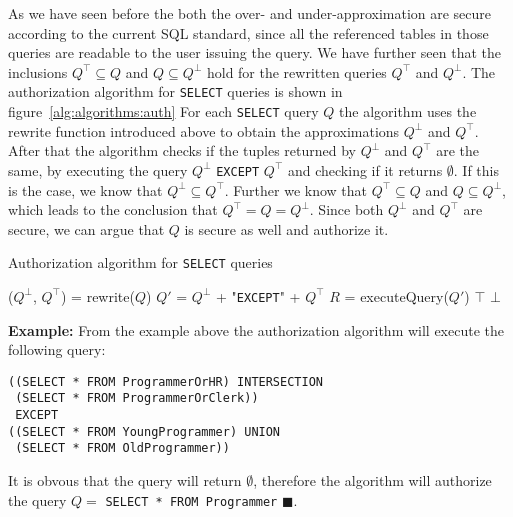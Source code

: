 As we have seen before the both the over- and under-approximation are secure according to the current SQL standard, since all the referenced tables in those queries are readable to the user issuing the query.
%
We have further seen that the inclusions $Q^\top \subseteq Q$ and $Q \subseteq Q^\bot$ hold for the rewritten queries $Q^\top$ and $Q^\bot$.
%
The authorization algorithm for \texttt{SELECT} queries is shown in figure~\ref{alg:algorithms:auth}
%
For each \texttt{SELECT} query $Q$ the algorithm uses the rewrite function introduced above to obtain the approximations $Q^\bot$ and $Q^\top$.
%
After that the algorithm checks if the tuples returned by $Q^\bot$ and $Q^\top$ are the same, by executing the query  $Q^\bot$ \texttt{EXCEPT} $Q^\top$ and checking if it returns $\emptyset$.
%
If this is the case, we know that $Q^\bot \subseteq Q^\top$.
%
Further we know that $Q^\top \subseteq Q$ and $Q \subseteq Q^\bot$, which leads to the conclusion that $Q^\top = Q = Q^\bot$.
%
Since both $Q^\bot$ and $Q^\top$ are secure, we can argue that $Q$ is secure as well and authorize it.
%
\begin{algorithm}
\caption{Authorization algorithm for \texttt{SELECT} queries}
\label{alg:algorithms:auth}
	\SetAlgoLined
	($Q^\bot$, $Q^\top$) = rewrite($Q$)\;
	$Q'$ = $Q^\bot$ + "\texttt{EXCEPT}" + $Q^\top$\;
	$R$ = executeQuery($Q'$)\;
		{\Return $\top$ \;}
		{\Return $\bot$ \;}
\end{algorithm}

\smallskip
\noindent
{\bf Example:}
From the example above the authorization algorithm will execute the following query:
\begin{verbatim}
((SELECT * FROM ProgrammerOrHR) INTERSECTION
 (SELECT * FROM ProgrammerOrClerk))
 EXCEPT
((SELECT * FROM YoungProgrammer) UNION
 (SELECT * FROM OldProgrammer))
\end{verbatim}
\noindent
It is obvous that the query will return $\emptyset$, therefore the algorithm will authorize the query $Q = $ \texttt{SELECT * FROM Programmer} $\blacksquare$.